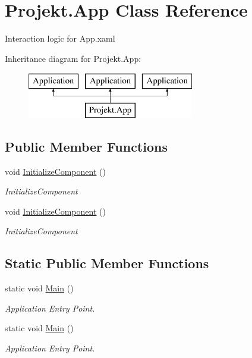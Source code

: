 \hypertarget{class_projekt_1_1_app}{}\section{Projekt.\+App Class Reference}
\label{class_projekt_1_1_app}


Interaction logic for App.\+xaml  


Inheritance diagram for Projekt.\+App\+:\begin{figure}[H]
\begin{center}
\leavevmode
\includegraphics[height=2.000000cm]{class_projekt_1_1_app}
\end{center}
\end{figure}
\subsection*{Public Member Functions}
\begin{DoxyCompactItemize}
\item 
void \mbox{\hyperlink{class_projekt_1_1_app_a635d2eb65d8980fdf881a2b5ce6213f8}{Initialize\+Component}} ()
\begin{DoxyCompactList}\small\item\em Initialize\+Component \end{DoxyCompactList}\item 
void \mbox{\hyperlink{class_projekt_1_1_app_a635d2eb65d8980fdf881a2b5ce6213f8}{Initialize\+Component}} ()
\begin{DoxyCompactList}\small\item\em Initialize\+Component \end{DoxyCompactList}\end{DoxyCompactItemize}
\subsection*{Static Public Member Functions}
\begin{DoxyCompactItemize}
\item 
static void \mbox{\hyperlink{class_projekt_1_1_app_a35398757aacd40ab369960c883a72b5e}{Main}} ()
\begin{DoxyCompactList}\small\item\em Application Entry Point. \end{DoxyCompactList}\item 
static void \mbox{\hyperlink{class_projekt_1_1_app_a35398757aacd40ab369960c883a72b5e}{Main}} ()
\begin{DoxyCompactList}\small\item\em Application Entry Point. \end{DoxyCompactList}\end{DoxyCompactItemize}


